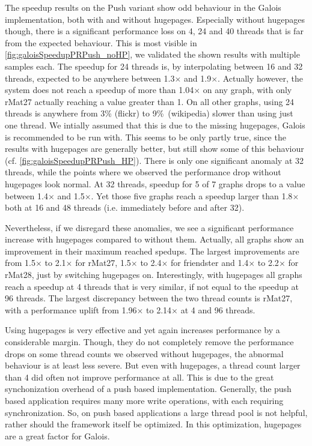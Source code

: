 The speedup results on the Push variant show odd behaviour in the Galois implementation, both with and without hugepages.
Especially without hugepages though, there is a significant performance loss on 4, 24 and 40 threads that is far from the expected behaviour. This is most visible in \autoref{fig:galoisSpeedupPRPush_noHP}, we validated the shown results with multiple samples each.
The speedup for 24 threads is, by interpolating between 16 and 32 threads, expected to be anywhere between 1.3$\times$ and 1.9$\times$.
Actually however, the system does not reach a speedup of more than 1.04$\times$ on any graph, with only rMat27 actually reaching a value greater than 1.
On all other graphs, using 24 threads is anywhere from 3\% (flickr) to 9\%\ (wikipedia) slower than using just one thread.
We intially assumed that this is due to the missing hugepages, Galois is recommended to be run with. This seems to be only partly true, since the results with hugepages are generally better, but still show some of this behaviour (cf. \autoref{fig:galoisSpeedupPRPush_HP}).
There is only one significant anomaly at 32 threads, while the points where we observed the performance drop without hugepages look normal.
At 32 threads, speedup for 5 of 7 graphs drops to a value between 1.4$\times$ and 1.5$\times$. Yet those five graphs reach a speedup larger than 1.8$\times$ both at 16 and 48 threads (i.e. immediately before and after 32).

Nevertheless, if we disregard these anomalies, we see a significant performance increase with hugepages compared to without them. Actually, all graphs show an improvement in their maximum reached spedups. The largest improvements are from 1.5$\times$ to 2.1$\times$ for rMat27, 1.5$\times$ to 2.4$\times$ for friendster and 1.4$\times$ to 2.2$\times$ for rMat28, just by switching hugepages on.
Interestingly, with hugepages all graphs reach a speedup at 4 threads that is very similar, if not equal to the speedup at 96 threads. The largest discrepancy between the two thread counts is rMat27, with a performance uplift from 1.96$\times$ to 2.14$\times$ at 4 and 96 threads.

Using hugepages is very effective and yet again increases performance by a considerable margin.
Though, they do not completely remove the performance drops on some thread counts we observed without hugepages, the abnormal behaviour is at least less severe.
But even with hugepages, a thread count larger than 4 did often not improve performance at all. This is due to the great synchonization overhead of a push based implementation. Generally, the push based application requires many more write operations, with each requiring synchronization.
So, on push based applications a large thread pool is not helpful, rather should the framework itself be optimized. In this optimization, hugepages are a great factor for Galois.
